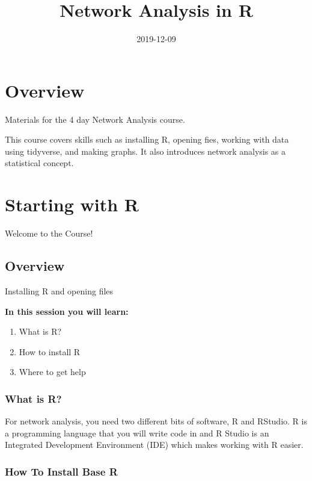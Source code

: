 \documentclass[]{book}
\title{Network Analysis in R}
\author{}
\date{2019-12-09}
\providecommand{\tightlist}{%
  \setlength{\itemsep}{0pt}\setlength{\parskip}{0pt}}
\begin{document}
\maketitle

{
\setcounter{tocdepth}{1}
\tableofcontents
}
\hypertarget{overview}{%
\chapter*{Overview}\label{overview}}

Materials for the 4 day Network Analysis course.

This course covers skills such as installing R, opening fies, working with data using tidyverse, and making graphs. It also introduces network analysis as a statistical concept.

\hypertarget{starting-with-r}{%
\chapter{Starting with R}\label{starting-with-r}}

{Welcome to the Course!}

\hypertarget{overview-1}{%
\section{Overview}\label{overview-1}}

Installing R and opening files

\textbf{In this session you will learn:}

\begin{enumerate}
\def\labelenumi{\arabic{enumi}.}
\tightlist
\item
  What is R?
\item
  How to install R
\item
  Where to get help
\end{enumerate}

\hypertarget{what-is-r}{%
\subsection{What is R?}\label{what-is-r}}

For network analysis, you need two different bits of software, R and RStudio. R is a programming language that you will write code in and R Studio is an Integrated Development Environment (IDE) which makes working with R easier.

\hypertarget{how-to-install-base-r}{%
\subsection{How To Install Base R}\label{how-to-install-base-r}}
\end{document}
